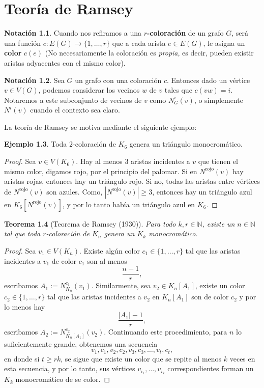 \documentclass[12pt]{report}
\theoremstyle{plain}
\newtheorem{theorem}{Teorema}[section]
\theoremstyle{definition}
\newtheorem{example}[theorem]{Ejemplo}
\newtheorem{notation}[theorem]{Notación}
\newcommand{\naturals}{\mathbb{N}}
\newcommand{\abs}[1]{\left \vert #1 \right \vert}
\begin{document}

\chapter{Teoría de Ramsey}

\begin{notation}
Cuando nos refiramos a una \textbf{$r$-coloración} de un grafo $G$, será una función $c : E(G) \to \{1, \ldots, r\}$ que a cada arista $e \in E(G)$, le asigna un \textbf{color} $c(e)$ (No necesariamente la coloración es \textit{propia}, es decir, pueden existir aristas adyacentes con el mismo color).
\end{notation}

\begin{notation}
Sea $G$ un grafo con una coloración $c$. Entonces dado un vértice $v \in V(G)$, podemos considerar los vecinos $w$ de $v$ tales que $c(vw) = i$. Notaremos a este subconjunto de vecinos de $v$ como $N^{i}_G (v)$, o simplemente $N^i (v)$ cuando el contexto sea claro.
\end{notation}


La teoría de Ramsey se motiva mediante el siguiente ejemplo:
\begin{example}\label{ejemplo:2-coloracion de K_6}
Toda $2$-coloración de $K_6$ genera un triángulo monocromático.
\end{example}
\begin{proof}
Sea $v \in V(K_6)$. Hay al menos $3$ aristas incidentes a $v$ que tienen el mismo color, digamos rojo, por el principio del palomar. Si en $N^{\text{rojo}} (v)$ hay aristas rojas, entonces hay un triángulo rojo. Si no, todas las aristas entre vértices de $N^{\text{rojo}} (v)$ son azules. Como, $\abs{N^{\text{rojo}}(v)} \geq 3$, entonces hay un triángulo azul en $K_6[N^{\text{rojo}}(v)]$, y por lo tanto había un triángulo azul en $K_6$.
\end{proof}

\begin{theorem}[Teorema de Ramsey (1930)]
Para todo $k, r \in \naturals$, existe un $n \in \naturals$ tal que toda $r$-coloración de $K_n$ genera un $K_k$ monocromático.
\end{theorem}
\begin{proof}
Sea $v_1 \in V(K_n)$. Existe algún color $c_1 \in \{1, \ldots, r\}$ tal que las aristas incidentes a $v_1$ de color $c_1$ son al menos
\[
    \frac{n-1}{r},
\]
escribamos $A_1 := N^{c_1}_{K_n} (v_1)$. Similarmente, sea $v_2 \in K_n [A_1]$, existe un color $c_2 \in \{1, \ldots,r \}$ tal que las aristas incidentes a $v_2$ en $K_n [A_1]$ son de color $c_2$ y por lo menos hay
\[
    \frac{\abs{A_1}-1}{r},
\]
escribamos $A_2 := N^{c_2}_{K_n[A_1]} (v_2)$.
Continuando este procedimiento, para $n$ lo suficientemente grande, obtenemos una secuencia
\[
    v_1, c_1, v_2, c_2, v_3, c_3, \ldots, v_t,c_t,
\]
en donde si $t \geq r k$, se sigue que existe un color que se repite al menos $k$ veces en esta secuencia, y por lo tanto, sus vértices $v_{i_1}, \ldots, v_{i_k}$ correspondientes forman un $K_k$ monocromático de se color.
\end{proof}
\end{document}
